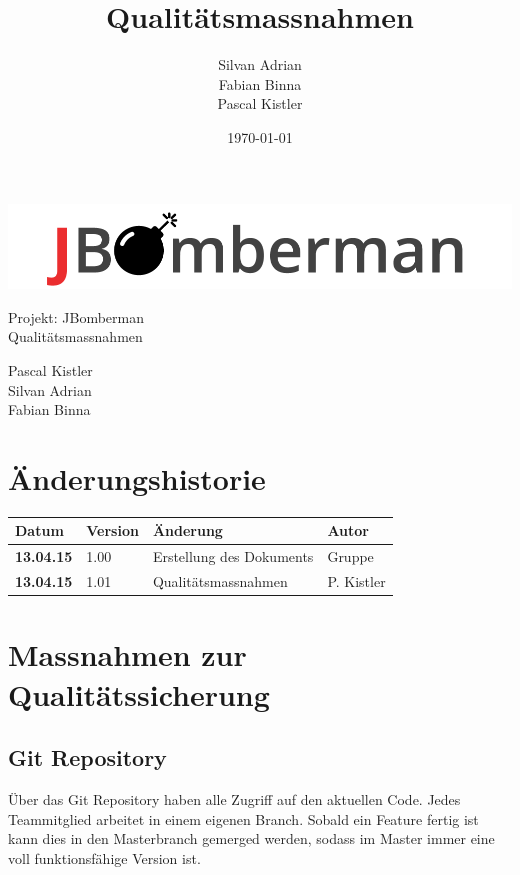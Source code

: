 \documentclass[11pt]{scrartcl}
\title{Qualitätsmassnahmen}
\author{Silvan Adrian \\ Fabian Binna \\ Pascal Kistler}
\date{\today{}}
\begin{document}
\def\arraystretch{1.5}
\begin{titlepage}
\begin{center}
\vspace{10em}
\includegraphics[scale=2]{jbomberman}
\vspace{10em}
\end{center}
\begin{center}
\huge {Projekt: JBomberman} \\
\huge {Qualitätsmassnahmen}
\end{center}
\begin{center}
\vspace{10em}
\LARGE {Pascal Kistler} \\
\LARGE {Silvan Adrian} \\
\LARGE {Fabian Binna}
\end{center}

\end{titlepage}

\newpage
\section{Änderungshistorie}
\label{sec:Änderungen}

\begin{tabularx}{\linewidth}{l l l l}
\textbf{Datum} & \textbf{Version} & \textbf{Änderung}  & \textbf{Autor} \\
\hline
\textbf{13.04.15} & 1.00 & Erstellung des Dokuments & Gruppe \\
\textbf{13.04.15} & 1.01 & Qualitätsmassnahmen & P. Kistler \\
\end{tabularx}

\newpage
\tableofcontents
\newpage


\section{Massnahmen zur Qualitätssicherung}
\subsection{Git Repository}
Über das Git Repository haben alle Zugriff auf den aktuellen Code.
Jedes Teammitglied arbeitet in einem eigenen Branch. Sobald ein Feature fertig ist kann dies in den Masterbranch gemerged werden, sodass im Master immer eine voll funktionsfähige Version  ist.
\end{document}
